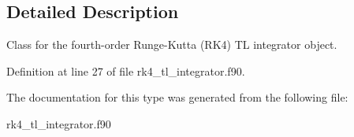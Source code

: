\subsection{Detailed Description}
Class for the fourth-\/order Runge-\/\+Kutta (R\+K4) TL integrator object. 

Definition at line 27 of file rk4\+\_\+tl\+\_\+integrator.\+f90.



The documentation for this type was generated from the following file\+:\begin{DoxyCompactItemize}
\item 
rk4\+\_\+tl\+\_\+integrator.\+f90\end{DoxyCompactItemize}
